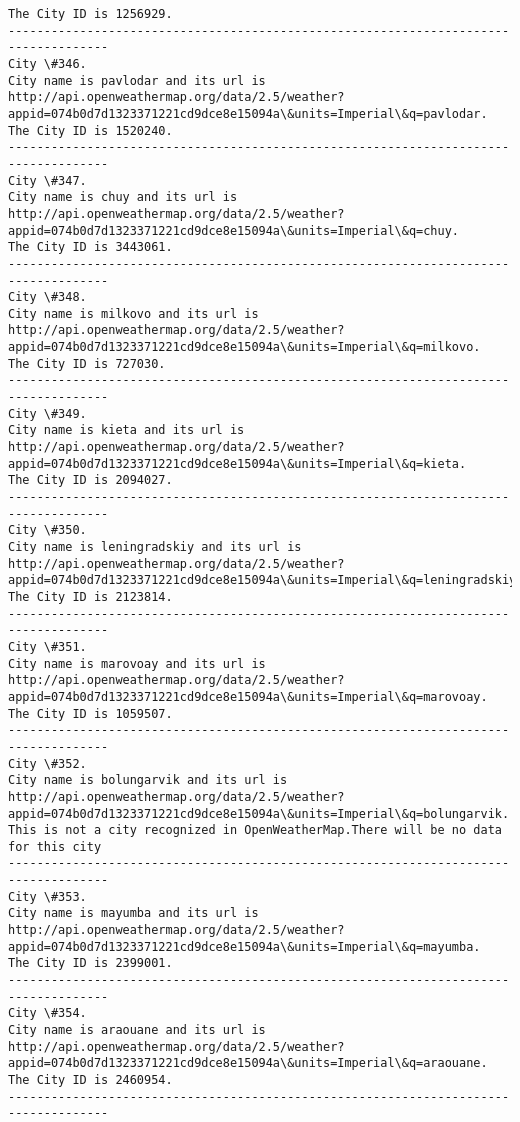 \documentclass[11pt]{article}
\begin{document}
\begin{Verbatim}[commandchars=\\\{\}]
The City ID is 1256929.
------------------------------------------------------------------------------------
City \#346.
City name is pavlodar and its url is http://api.openweathermap.org/data/2.5/weather?appid=074b0d7d1323371221cd9dce8e15094a\&units=Imperial\&q=pavlodar.
The City ID is 1520240.
------------------------------------------------------------------------------------
City \#347.
City name is chuy and its url is http://api.openweathermap.org/data/2.5/weather?appid=074b0d7d1323371221cd9dce8e15094a\&units=Imperial\&q=chuy.
The City ID is 3443061.
------------------------------------------------------------------------------------
City \#348.
City name is milkovo and its url is http://api.openweathermap.org/data/2.5/weather?appid=074b0d7d1323371221cd9dce8e15094a\&units=Imperial\&q=milkovo.
The City ID is 727030.
------------------------------------------------------------------------------------
City \#349.
City name is kieta and its url is http://api.openweathermap.org/data/2.5/weather?appid=074b0d7d1323371221cd9dce8e15094a\&units=Imperial\&q=kieta.
The City ID is 2094027.
------------------------------------------------------------------------------------
City \#350.
City name is leningradskiy and its url is http://api.openweathermap.org/data/2.5/weather?appid=074b0d7d1323371221cd9dce8e15094a\&units=Imperial\&q=leningradskiy.
The City ID is 2123814.
------------------------------------------------------------------------------------
City \#351.
City name is marovoay and its url is http://api.openweathermap.org/data/2.5/weather?appid=074b0d7d1323371221cd9dce8e15094a\&units=Imperial\&q=marovoay.
The City ID is 1059507.
------------------------------------------------------------------------------------
City \#352.
City name is bolungarvik and its url is http://api.openweathermap.org/data/2.5/weather?appid=074b0d7d1323371221cd9dce8e15094a\&units=Imperial\&q=bolungarvik.
This is not a city recognized in OpenWeatherMap.There will be no data for this city
------------------------------------------------------------------------------------
City \#353.
City name is mayumba and its url is http://api.openweathermap.org/data/2.5/weather?appid=074b0d7d1323371221cd9dce8e15094a\&units=Imperial\&q=mayumba.
The City ID is 2399001.
------------------------------------------------------------------------------------
City \#354.
City name is araouane and its url is http://api.openweathermap.org/data/2.5/weather?appid=074b0d7d1323371221cd9dce8e15094a\&units=Imperial\&q=araouane.
The City ID is 2460954.
------------------------------------------------------------------------------------

\end{Verbatim}
\end{document}
